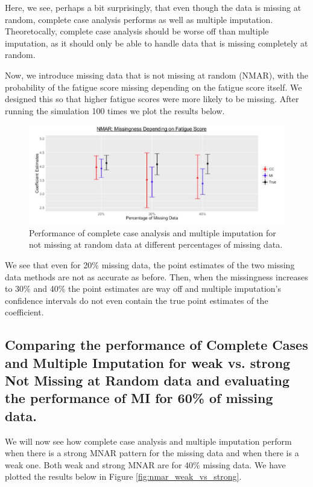 \documentclass[fleqn,10pt]{wlscirep}\usepackage[]{graphicx}\usepackage[]{color}
\begin{document}
Here, we see, perhaps a bit surprisingly, that even though the data is missing at random, complete case analysis performs as well as multiple imputation. Theoretocally, complete case analysis should be worse off than multiple imputation, as it should only be able to handle data that is missing completely at random. 

Now, we introduce missing data that is not missing at random (NMAR), with the probability of the fatigue score missing depending on the fatigue score itself. We designed this so that higher fatigue scores were more likely to be missing. After running the simulation 100 times we plot the results below. 

\begin{figure}[H]
\centering
\includegraphics[width=\linewidth]{nmar_res_plot}
\caption{Performance of complete case analysis and multiple imputation for not missing at random data at different percentages of missing data.}
\label{fig:nmar_res_plot}
\end{figure}

We see that even for 20\% missing data, the point estimates of the two missing data methods are not as accurate as before. Then, when the missingness increases to 30\% and 40\% the point estimates are way off and multiple imputation's confidence intervals do not even contain the true point estimates of the coefficient. 


\subsection{Comparing the performance of Complete Cases and Multiple Imputation for weak vs. strong Not Missing at Random data and evaluating the performance of MI for 60\% of missing data.}

We will now see how complete case analysis and multiple imputation perform when there is a strong MNAR pattern for the missing data and when there is a weak one. Both weak and strong MNAR are for 40\% missing data. We have plotted the results below in Figure \ref{fig:nmar_weak_vs_strong}.   
\end{document}
